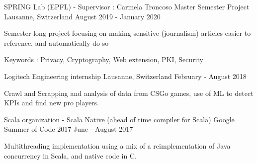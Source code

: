 \begin{cventries}
	\cventry
	{SPRING Lab (EPFL) - Supervisor : Carmela Troncoso} %
	{Master Semester Project} %
	{Lausanne, Switzerland} %
	{August 2019 - January 2020} %
	{ %
		\begin{cvitems}
			\item {Semester long project focusing on making sensitive (journalism) articles easier to reference, and automatically do so}
			\item {Keywords : Privacy, Cryptography, Web extension, PKI, Security}
		\end{cvitems}
	}
	
	
	
	\cventry
	{Logitech} %
	{Engineering internship} %
	{Lausanne, Switzerland} %
	{February - August 2018} %
	{ %
		\begin{cvitems}
			\item {Crawl and Scrapping and analysis of data from CSGo games, use of ML to detect KPIs and find new pro players.}
		\end{cvitems}
	}
	
	
	\cventry
	{Scala organization - Scala Native (ahead of time compiler for Scala)} %
	{Google Summer of Code 2017} %
	{} %
	{June - August 2017} %
	{ %
		\begin{cvitems}
			\item {Multithreading implementation using a mix of a reimplementation of Java concurrency in Scala, and native code in C.}
		\end{cvitems}
	}
	
	
	
	
	
	
\end{cventries}